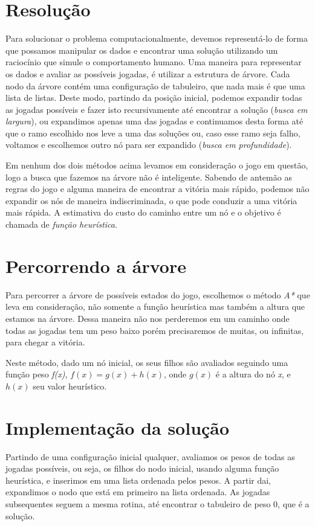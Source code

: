 \documentclass[a4paper,11pt]{article}
\begin{document}
\section{Resolução}
Para solucionar o problema computacionalmente, devemos representá-lo de forma
que possamos manipular os dados e encontrar uma solução utilizando um raciocínio
que simule o comportamento humano. Uma maneira para representar os dados e
avaliar as possíveis jogadas, é utilizar a estrutura de árvore. Cada nodo da árvore contém uma configuração de tabuleiro, que nada mais é que uma lista de listas.
Deste modo, partindo da posição inicial, podemos expandir todas as jogadas possíveis e fazer
isto recursivamente até encontrar a solução ({\it busca em largura}), ou
expandimos apenas uma das jogadas e continuamos desta forma até que o ramo
escolhido nos leve a uma das soluções ou, caso esse ramo seja falho, voltamos e
escolhemos outro nó para ser expandido ({\it busca em profundidade}).

Em nenhum dos dois métodos acima levamos em consideração o jogo em questão, logo
a busca que fazemos na árvore não é inteligente. Sabendo de antemão as regras do
jogo e alguma maneira de encontrar a vitória mais rápido, podemos não
expandir os
nós de maneira indiscriminada, o que pode conduzir a uma vitória mais rápida. A
estimativa do custo do caminho entre um nó e o objetivo é chamada de {\it função
  heurística}.

\section{Percorrendo a árvore}
Para percorrer a árvore de possíveis estados do jogo, escolhemos o método
\textit{A*} que
leva em consideração, não somente a função heurística mas também a altura que
estamos na árvore. Dessa maneira não nos perderemos em um caminho onde todas as
jogadas tem um peso baixo porém precisaremos de muitas, ou infinitas, para chegar
a vitória.

Neste método, dado um nó inicial, os seus filhos são avaliados seguindo uma
função peso {\it f(x)}, $ f(x) = g(x) + h(x) $, onde $ g(x) $ é a altura do nó
{\it x}, e $h(x)$ seu valor heurístico.


\section{Implementação da solução}
Partindo de uma configuração inicial qualquer, avaliamos os pesos de todas as
jogadas possíveis, ou seja, os filhos do nodo inicial, usando alguma função heurística, e inserimos em uma lista ordenada pelos
pesos. A partir dai, expandimos o nodo que está em primeiro na lista ordenada.
As jogadas subsequentes seguem a mesma rotina, até encontrar o tabuleiro de peso 0, que é a solução.
\end{document}
